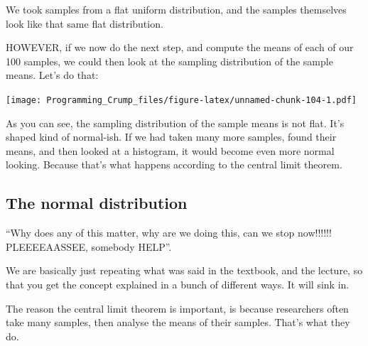 \documentclass[]{book}
\newenvironment{Shaded}{\begin{snugshade}}{\end{snugshade}}
\newcommand{\KeywordTok}[1]{\textcolor[rgb]{0.13,0.29,0.53}{\textbf{{#1}}}}
\newcommand{\DataTypeTok}[1]{\textcolor[rgb]{0.13,0.29,0.53}{{#1}}}
\newcommand{\DecValTok}[1]{\textcolor[rgb]{0.00,0.00,0.81}{{#1}}}
\newcommand{\StringTok}[1]{\textcolor[rgb]{0.31,0.60,0.02}{{#1}}}
\newcommand{\CommentTok}[1]{\textcolor[rgb]{0.56,0.35,0.01}{\textit{{#1}}}}
\newcommand{\NormalTok}[1]{{#1}}
\theoremstyle{definition}
\theoremstyle{definition}
\theoremstyle{definition}
\theoremstyle{remark}
\begin{document}
We took samples from a flat uniform distribution, and the samples
themselves look like that same flat distribution.

HOWEVER, if we now do the next step, and compute the means of each of
our 100 samples, we could then look at the sampling distribution of the
sample means. Let's do that:

\begin{Shaded}
\end{Shaded}

\texttt{[image: Programming\_Crump\_files/figure-latex/unnamed-chunk-104-1.pdf]}

As you can see, the sampling distribution of the sample means is not
flat. It's shaped kind of normal-ish. If we had taken many more samples,
found their means, and then looked at a histogram, it would become even
more normal looking. Because that's what happens according to the
central limit theorem.

\subsection{The normal distribution}\label{the-normal-distribution}

``Why does any of this matter, why are we doing this, can we stop
now!!!!!! PLEEEEAASSEE, somebody HELP''.

We are basically just repeating what was said in the textbook, and the
lecture, so that you get the concept explained in a bunch of different
ways. It will sink in.

The reason the central limit theorem is important, is because
researchers often take many samples, then analyse the means of their
samples. That's what they do.
\end{document}
